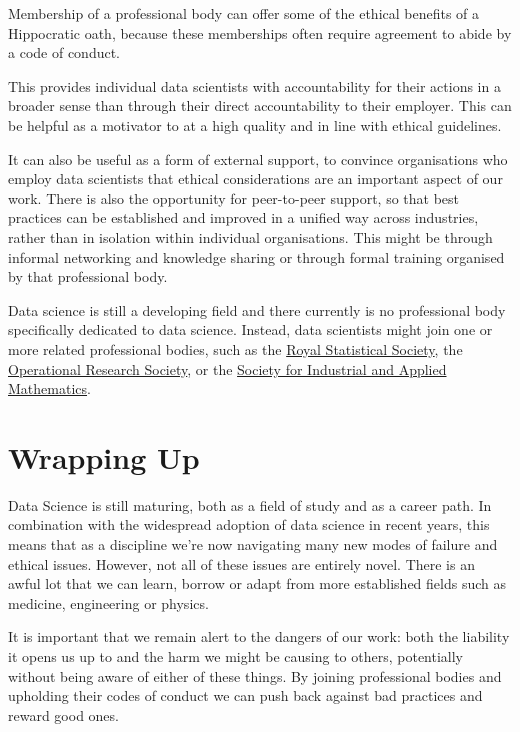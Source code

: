 \documentclass[
  letterpaper,
  DIV=11,
  numbers=noendperiod]{scrreprt}
\begin{document}
Membership of a professional body can offer some of the ethical benefits
of a Hippocratic oath, because these memberships often require agreement
to abide by a code of conduct.

This provides individual data scientists with accountability for their
actions in a broader sense than through their direct accountability to
their employer. This can be helpful as a motivator to at a high quality
and in line with ethical guidelines.

It can also be useful as a form of external support, to convince
organisations who employ data scientists that ethical considerations are
an important aspect of our work. There is also the opportunity for
peer-to-peer support, so that best practices can be established and
improved in a unified way across industries, rather than in isolation
within individual organisations. This might be through informal
networking and knowledge sharing or through formal training organised by
that professional body.

Data science is still a developing field and there currently is no
professional body specifically dedicated to data science. Instead, data
scientists might join one or more related professional bodies, such as
the \href{https://rss.org.uk/}{Royal Statistical Society}, the
\href{https://www.theorsociety.com/}{Operational Research Society}, or
the \href{https://www.siam.org/}{Society for Industrial and Applied
Mathematics}.

\section{Wrapping Up}\label{wrapping-up-10}

Data Science is still maturing, both as a field of study and as a career
path. In combination with the widespread adoption of data science in
recent years, this means that as a discipline we're now navigating many
new modes of failure and ethical issues. However, not all of these
issues are entirely novel. There is an awful lot that we can learn,
borrow or adapt from more established fields such as medicine,
engineering or physics.

It is important that we remain alert to the dangers of our work: both
the liability it opens us up to and the harm we might be causing to
others, potentially without being aware of either of these things. By
joining professional bodies and upholding their codes of conduct we can
push back against bad practices and reward good ones.
\end{document}
